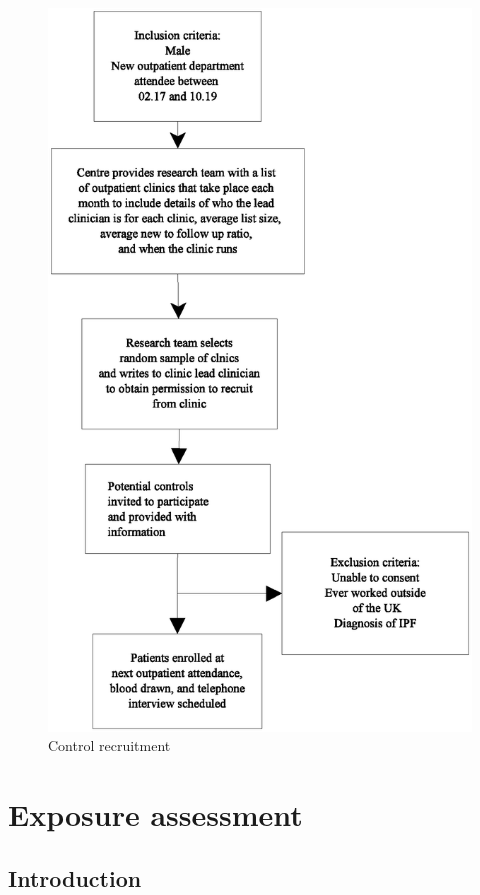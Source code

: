 \documentclass[a4paper,10pt]{article}
\begin{document}
\begin{figure}
\includegraphics[scale=0.8]{fig/control-recruitment.eps}
\caption{Control recruitment\label{fig:contrec}}
\end{figure}

\section{Exposure assessment}

\subsection{Introduction}
\end{document}
